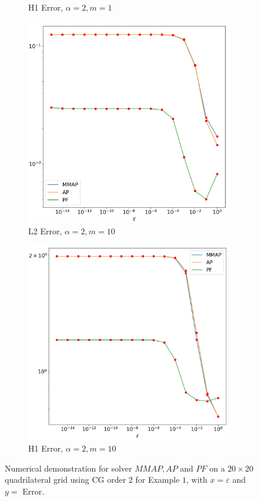 \documentclass[12pt]{ociamthesis}
\begin{document}
\begin{figure}[H]
\begin{subfigure}{0.42\textwidth}
     \caption{H1 Error, $\alpha=2, m=1$}
 \end{subfigure}
 \begin{subfigure}{0.42\textwidth}
     \includegraphics[width=\textwidth]{Pics/LHSims/E1c_MMAP_AP_PFL2.png}
     \caption{L2 Error, $\alpha=2, m=10$} \label{E1_Strong_Ans}
 \end{subfigure}
 \hfill
 \begin{subfigure}{0.42\textwidth}
     \includegraphics[width=\textwidth]{Pics/LHSims/E1c_MMAP_AP_PFH1.png}
     \caption{H1 Error, $\alpha=2, m=10$}
 \end{subfigure}
 \caption{Numerical demonstration for solver $MMAP, AP$ and $PF$ on a $20\times 20$ quadrilateral grid using CG order $2$ for Example $1$, with $x=\varepsilon$ and $y=$ Error.} \label{E1_LH_PF}
\end{figure}
\end{document}
